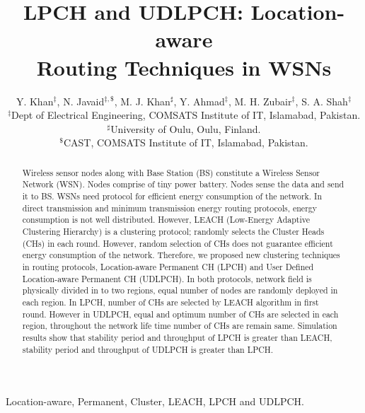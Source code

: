 \documentclass[journal]{IEEEtran}
\begin{document}
\title{LPCH and UDLPCH: Location-aware \\Routing Techniques in WSNs}

\author{Y. Khan$^{\ddag}$, N. Javaid$^{\ddag,\$}$, M. J. Khan$^{\sharp}$, Y. Ahmad$^{\ddag}$, M. H. Zubair$^{\ddag}$, S. A. Shah$^{\ddag}$\\\vspace{0.4cm}
$^{\ddag}$Dept of Electrical Engineering, COMSATS Institute of IT, Islamabad, Pakistan.\\
        $^{\sharp}$University of Oulu, Oulu, Finland.\\
        $^{\$}$CAST, COMSATS Institute of IT, Islamabad, Pakistan.
     }

\maketitle

\begin{abstract}
Wireless sensor nodes along with Base Station (BS) constitute a Wireless Sensor Network (WSN). Nodes comprise of tiny power battery. Nodes sense the data and send it to BS. WSNs need protocol for efficient energy consumption of the network. In direct transmission and minimum transmission energy routing protocols, energy consumption is not well distributed. However, LEACH (Low-Energy Adaptive Clustering Hierarchy) is a clustering protocol; randomly selects the Cluster Heads (CHs) in each round. However, random selection of CHs does not guarantee efficient energy consumption of the network. Therefore, we proposed new clustering techniques in routing protocols, Location-aware Permanent CH (LPCH) and User Defined Location-aware Permanent CH (UDLPCH). In both protocols, network field is physically divided in to two regions, equal number of nodes are randomly deployed in each region. In LPCH, number of CHs are selected by LEACH algorithm in first round. However in UDLPCH, equal and optimum number of CHs are selected in each region, throughout the network life time number of CHs are remain same. Simulation results show that stability period and throughput of LPCH is greater than LEACH, stability period and throughput of UDLPCH is greater than LPCH.
\end{abstract}

\begin{IEEEkeywords}
Location-aware, Permanent, Cluster, LEACH, LPCH and UDLPCH.
\end{IEEEkeywords}

\IEEEpeerreviewmaketitle
\end{document}
